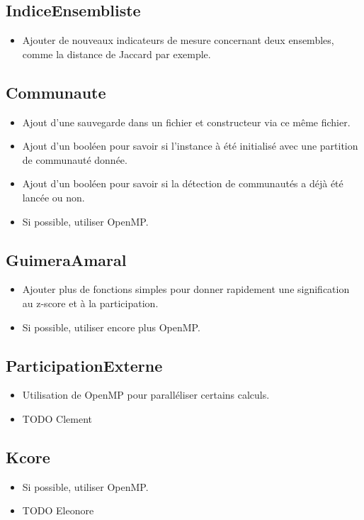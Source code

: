 \begin{titlepage}
\subsection{IndiceEnsembliste}
{
\begin{itemize}
    \item Ajouter de nouveaux indicateurs de mesure concernant deux ensembles, comme la distance de Jaccard par exemple.
\end{itemize}
}

\subsection{Communaute}
{
\begin{itemize}
    \item Ajout d'une sauvegarde dans un fichier et constructeur via ce même fichier.
    \item Ajout d'un booléen pour savoir si l'instance à été initialisé avec une partition de communauté donnée.
    \item Ajout d'un booléen pour savoir si la détection de communautés a déjà été lancée ou non.
    \item Si possible, utiliser OpenMP.
\end{itemize}
}

\subsection{GuimeraAmaral}
{
\begin{itemize}
    \item Ajouter plus de fonctions simples pour donner rapidement une signification au z-score et à la participation.
    \item Si possible, utiliser encore plus OpenMP.
\end{itemize}
}

\subsection{ParticipationExterne}
{
\begin{itemize}
    \item Utilisation de OpenMP pour paralléliser certains calculs.
    \item TODO Clement
\end{itemize}
}

\subsection{Kcore}
{
\begin{itemize}
    \item Si possible, utiliser OpenMP.
    \item TODO Eleonore
\end{itemize}
}


\end{titlepage}
